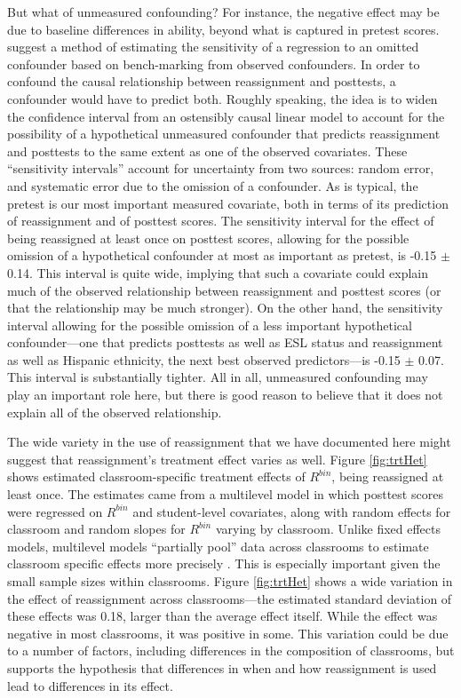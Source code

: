 \documentclass[notitlepage,12pt]{jedm}\usepackage[]{graphicx}\usepackage[]{color}
\begin{document}
But what of unmeasured confounding?
For instance, the negative effect may be due to baseline differences
in ability, beyond what is captured in pretest scores.
 suggest a method of estimating the sensitivity of a regression to an omitted confounder based on bench-marking from observed confounders.
In order to confound the causal relationship between reassignment and posttests, a confounder would have to predict both.
Roughly speaking, the idea is to widen the confidence interval from an
ostensibly causal linear model to account for the possibility of a hypothetical unmeasured confounder that predicts reassignment and posttests to the same extent as one of the observed covariates.
These ``sensitivity intervals'' account for uncertainty from two sources: random error, and systematic error due to the omission of a confounder.
As is typical, the pretest is our most important measured covariate, both in terms of its prediction of reassignment and of posttest scores.
The sensitivity interval for the effect of being reassigned at least
once on posttest scores, allowing for the possible omission of a
hypothetical confounder at most as important as pretest, is
-0.15 $\pm$
0.14.
This interval is quite wide, implying that such a covariate could
explain much of the observed relationship between reassignment and
posttest scores (or that the relationship may be much stronger).
On the other hand, the sensitivity interval allowing for the possible
omission of a less important hypothetical confounder---one that
predicts posttests as well as ESL status and reassignment as well as
Hispanic ethnicity, the next best observed
predictors---is
-0.15 $\pm$
0.07.
This interval is substantially tighter.
All in all, unmeasured confounding may play an important role here,
but there is good reason to believe that it does not explain all of
the observed relationship.

The wide variety in the use of reassignment that we have documented
here might suggest that reassignment's treatment effect varies as
well.
Figure \ref{fig:trtHet} shows estimated classroom-specific treatment
effects of $R^{bin}$, being reassigned at least once.
The estimates came from a multilevel model in which posttest scores
were regressed on $R^{bin}$ and student-level covariates, along with
random effects for classroom and random slopes for $R^{bin}$ varying
by classroom.
Unlike fixed effects models, multilevel models ``partially pool'' data
across classrooms to estimate classroom specific effects more precisely \cite{gelmanHill}.
This is especially important given the small sample sizes within
classrooms.
Figure \ref{fig:trtHet} shows a wide variation in the effect of
reassignment across classrooms---the estimated standard deviation of
these effects was
0.18,
larger than the average effect itself.
While the effect was negative in most classrooms, it was positive in some.
This variation could be due to a number of factors, including
differences in the composition of classrooms, but supports the
hypothesis that differences in when and how reassignment is used
lead to differences in its effect.
\end{document}
